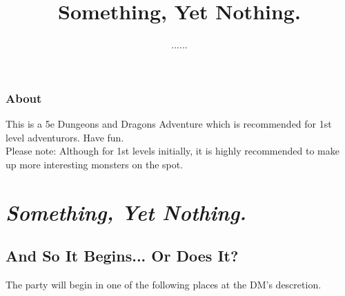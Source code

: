 \documentclass[10pt]{report}
\author{......}
\title{Something, Yet Nothing.}
\begin{document}
\maketitle
\tableofcontents

\newpage
\section{About}

	This is a 5e Dungeons and Dragons Adventure which is recommended for 1st level adventurors. Have fun. \\
	
	Please note: Although for 1st levels initially, it is highly recommended to make up more interesting monsters on the spot. 

\part{\textit{Something, Yet Nothing.}}
\chapter{And So It Begins... Or Does It?}

    The party will begin in one of the following places at the DM's descretion.
    
\end{document}
